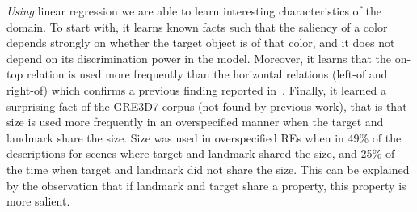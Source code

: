 \textit{Using} linear regression we are able to learn interesting characteristics of the domain. To start with, it learns known facts such that the 
saliency of a color depends strongly on whether the target object is of that color, and it does not depend on its discrimination power 
in the model. Moreover, it learns that the on-top relation is used more frequently than the horizontal relations (left-of and right-of) 
which confirms a previous finding reported in~\cite{viet:gene11}. Finally, it learned a surprising fact of the GRE3D7 corpus
 (not found by previous work), that is that size is used more frequently in an overspecified manner when the target and landmark share the
 size. Size was used in overspecified REs when in 49\% of the descriptions for scenes where target and landmark shared the size, and 25\% 
of the time when target and landmark did not share the size. This can be explained by the observation that if landmark and target share a
 property, this property is more salient. 

